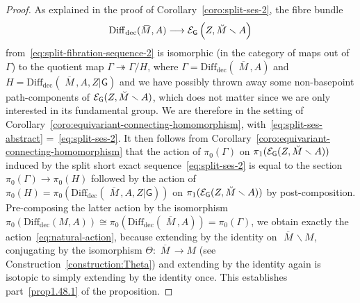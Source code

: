 \documentclass[AHL,Unicode,published]{cedram}
\newcommand{\rdec}{\mathrm{dec}}
\newcommand{\mbar}{\ensuremath{{\,\,\overline{\!\! M\!}\,}}}
\newcommand{\sG}{\mathsf{G}}
\newcommand{\cE}{\mathcal{E}}
\newcommand{\too}{\ensuremath{\longrightarrow}}
\newcommand{\diffdec}{\ensuremath{\mathrm{Diff}_{\rdec}}}
\begin{document}
\begin{proof}
As explained in the proof of Corollary~\ref{coro:split-ses-2}, the fibre bundle
\[
\diffdec(\mbar,A) \too \cE_{\sG}\left(Z,\Breve{M} \smallsetminus A\right)
\]
from~\eqref{eq:split-fibration-sequence-2} is isomorphic (in the category of maps out of $\Gamma$) to the quotient map $\Gamma \twoheadrightarrow \Gamma/H$, where $\Gamma = \diffdec(\mbar,A)$ and $H = \diffdec(\mbar,A,Z|\sG)$ and we have possibly thrown away some non-basepoint path-components of $\cE_{\sG}(Z,\Breve{M} \smallsetminus A)$, which does not matter since we are only interested in its fundamental group. We are therefore in the setting of Corollary~\ref{coro:equivariant-connecting-homomorphism}, with~\eqref{eq:split-ses-abstract} =~\eqref{eq:split-ses-2}. It then follows from Corollary~\ref{coro:equivariant-connecting-homomorphism} that the action of $\pi_{0}(\Gamma)$ on $\pi_{1}(\cE_{\sG}(Z,\Breve{M} \smallsetminus A))$ induced by the split short exact sequence~\eqref{eq:split-ses-2} is equal to the section $\pi_{0}(\Gamma) \to \pi_{0}(H)$ followed by the action of $\pi_{0}(H) = \pi_{0}(\diffdec(\mbar,A,Z|\sG))$ on $\pi_{1}(\cE_{\sG}(Z,\Breve{M} \smallsetminus A))$ by post-composition. Pre-composing the latter action by the isomorphism $\pi_{0}(\diffdec(M,A)) \cong \pi_{0}(\diffdec(\mbar,A)) = \pi_{0}(\Gamma)$, we obtain exactly the action~\eqref{eq:natural-action}, because extending by the identity on $\mbar \smallsetminus M$, conjugating by the isomorphism $\Theta \colon \mbar \to M$ (see Construction~\ref{construction:Theta}) and extending by the identity again is isotopic to simply extending by the identity once. This establishes part~\eqref{prop1.48.1} of the proposition.


\end{proof}
\end{document}
